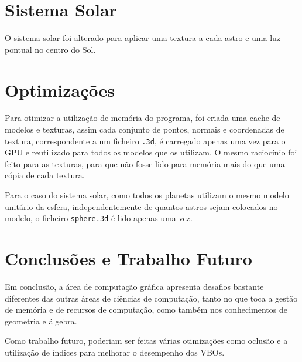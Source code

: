 \documentclass[a4paper]{article}
\begin{document}
\section{Sistema Solar}
O sistema solar foi alterado para aplicar uma textura a cada astro e uma luz
pontual no centro do Sol.

\section{Optimizações}
Para otimizar a utilização de memória do programa, foi criada uma cache de
modelos e texturas, assim cada conjunto de pontos, normais e coordenadas de
textura, correspondente a um ficheiro \texttt{.3d}, é carregado apenas uma vez
para o GPU e reutilizado para todos os modelos que os utilizam. O mesmo
raciocínio foi feito para as texturas, para que não fosse lido para memória
mais do que uma cópia de cada textura.

Para o caso do sistema solar, como todos os planetas utilizam o mesmo modelo
unitário da esfera, independentemente de quantos astros sejam colocados no
modelo, o ficheiro \texttt{sphere.3d} é lido apenas uma vez.

\section{Conclusões e Trabalho Futuro}

Em conclusão, a área de computação gráfica apresenta desafios bastante
diferentes das outras áreas de ciências de computação, tanto no que toca a
gestão de memória e de recursos de computação, como também nos conhecimentos de
geometria e álgebra.

Como trabalho futuro, poderiam ser feitas várias otimizações como oclusão e a
utilização de índices para melhorar o desempenho dos VBOs.
\end{document}
